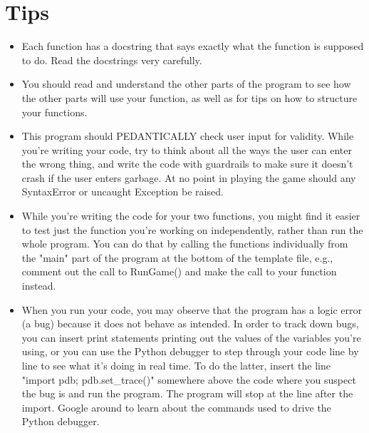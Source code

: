 \documentclass[11pt]{amsart}
\begin{document}
\section*{Tips}
\begin{itemize}
	\item Each function has a docstring that says exactly what the function is supposed to do. Read
  the docstrings very carefully.
	\item You should read and understand the other parts of the program to see how the other parts
  will use your function, as well as for tips on how to structure your functions.
	\item This program should PEDANTICALLY check user input for validity. While you're writing your
  code, try to think about all the ways the user can enter the wrong thing, and write the code
  with guardrails to make sure it doesn't crash if the user enters garbage. At no point in
	playing the game should any SyntaxError or uncaught Exception be raised.
	\item While you're writing the code for your two functions, you might find it easier to test just
  the function you're working on independently, rather than run the whole program. You can do
	that by calling the functions individually from the "main" part of the program at the bottom
	of the template file, e.g., comment out the call to RunGame() and make the call to your function
  instead.
	\item When you run your code, you may observe that the program has a logic error (a bug) because
  it does not behave as intended. In order to track down bugs, you can insert print statements
	printing out the values of the variables you're using, or you can use the Python debugger
	to step through your code line by line to see what it's doing in real time.
  To do the latter, insert the line "import pdb; pdb.set_trace()" somewhere above the code
  where you suspect the bug is and run the program. The program will stop at the line after
	the import. Google around to learn about the commands used to drive the Python debugger.
\end{itemize}
\end{document}
